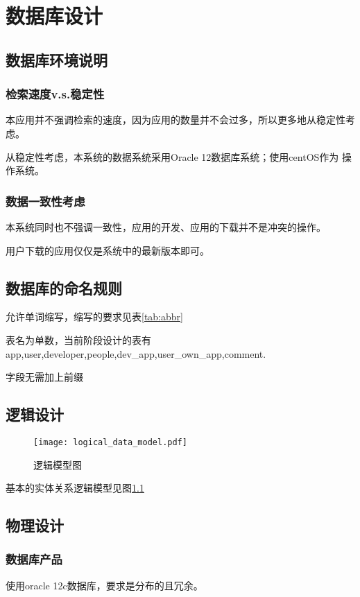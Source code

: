 \chapter{数据库设计}
\section{数据库环境说明}
{\color{red}
\subsection{检索速度v.s.稳定性}
本应用并不强调检索的速度，因为应用的数量并不会过多，所以更多地从稳定性考虑。

    从稳定性考虑，本系统的数据系统采用Oracle 12数据库系统；使用centOS作为
    操作系统。

\subsection{数据一致性考虑}
本系统同时也不强调一致性，应用的开发、应用的下载并不是冲突的操作。

用户下载的应用仅仅是系统中的最新版本即可。

}



\section{数据库的命名规则}
允许单词缩写，缩写的要求见表\ref{tab:abbr}

表名为单数，当前阶段设计的表有app,user,developer,people,dev\_app,user\_own\_app,comment.

字段无需加上前缀


\section{逻辑设计}
\begin{figure}[ht]
	\centering
	\texttt{[image: logical\_data\_model.pdf]}
	\caption{逻辑模型图} \label{fig:logical_data_model.pdf}
\end{figure}
基本的实体关系逻辑模型见图\ref{fig:logical_data_model.pdf}



\section{物理设计}
\subsection{数据库产品}
使用oracle 12c数据库，要求是分布的且冗余。

